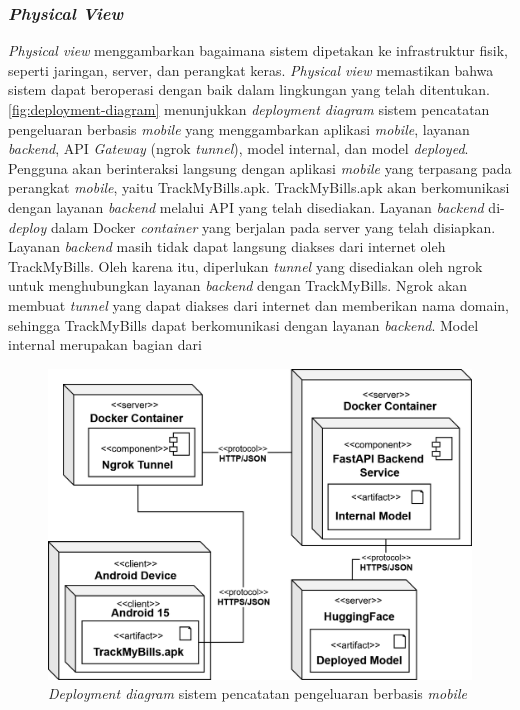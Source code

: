 \subsubsection{\emph{Physical View}}
\label{subsubsec:physical-view}
\emph{Physical view} menggambarkan bagaimana sistem dipetakan ke infrastruktur fisik, seperti jaringan, server, dan perangkat keras. \emph{Physical view} memastikan bahwa sistem dapat beroperasi dengan baik dalam lingkungan yang telah ditentukan. \autoref{fig:deployment-diagram} menunjukkan \emph{deployment diagram} sistem pencatatan pengeluaran berbasis \emph{mobile} yang menggambarkan aplikasi \emph{mobile}, layanan \emph{backend}, API \emph{Gateway} (ngrok \emph{tunnel}), model internal, dan model \emph{deployed}. Pengguna akan berinteraksi langsung dengan aplikasi \emph{mobile} yang terpasang pada perangkat \emph{mobile}, yaitu TrackMyBills.apk. TrackMyBills.apk akan berkomunikasi dengan layanan \emph{backend} melalui API yang telah disediakan. Layanan \emph{backend} di-\emph{deploy} dalam Docker \emph{container} yang berjalan pada server yang telah disiapkan. Layanan \emph{backend} masih tidak dapat langsung diakses dari internet oleh TrackMyBills. Oleh karena itu, diperlukan \emph{tunnel} yang disediakan oleh ngrok untuk menghubungkan layanan \emph{backend} dengan TrackMyBills. Ngrok akan membuat \emph{tunnel} yang dapat diakses dari internet dan memberikan nama domain, sehingga TrackMyBills dapat berkomunikasi dengan layanan \emph{backend}. Model internal merupakan bagian dari 
\begin{figure}[htbp]
    \centering
    \includegraphics[width=1\textwidth]{images/deployment-diagram.png}
    \caption{\emph{Deployment diagram} sistem pencatatan pengeluaran berbasis \emph{mobile}}
    \label{fig:deployment-diagram}
\end{figure}